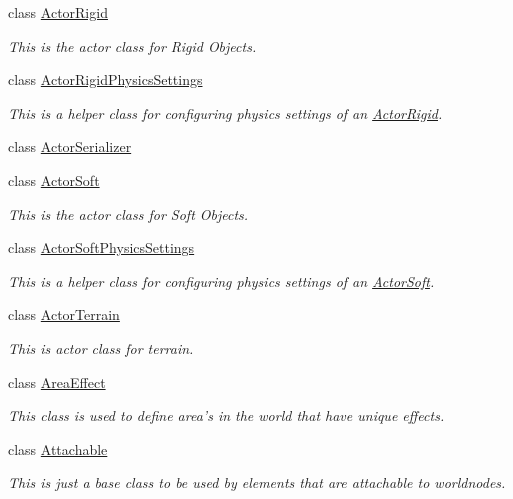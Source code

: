 \begin{DoxyCompactItemize}
class \hyperlink{classphys_1_1ActorRigid}{ActorRigid}
\begin{DoxyCompactList}\small\item\em This is the actor class for Rigid Objects. \item\end{DoxyCompactList}\item 
class \hyperlink{classphys_1_1ActorRigidPhysicsSettings}{ActorRigidPhysicsSettings}
\begin{DoxyCompactList}\small\item\em This is a helper class for configuring physics settings of an \hyperlink{classphys_1_1ActorRigid}{ActorRigid}. \item\end{DoxyCompactList}\item 
class \hyperlink{classphys_1_1ActorSerializer}{ActorSerializer}
\item 
class \hyperlink{classphys_1_1ActorSoft}{ActorSoft}
\begin{DoxyCompactList}\small\item\em This is the actor class for Soft Objects. \item\end{DoxyCompactList}\item 
class \hyperlink{classphys_1_1ActorSoftPhysicsSettings}{ActorSoftPhysicsSettings}
\begin{DoxyCompactList}\small\item\em This is a helper class for configuring physics settings of an \hyperlink{classphys_1_1ActorSoft}{ActorSoft}. \item\end{DoxyCompactList}\item 
class \hyperlink{classphys_1_1ActorTerrain}{ActorTerrain}
\begin{DoxyCompactList}\small\item\em This is actor class for terrain. \item\end{DoxyCompactList}\item 
class \hyperlink{classphys_1_1AreaEffect}{AreaEffect}
\begin{DoxyCompactList}\small\item\em This class is used to define area's in the world that have unique effects. \item\end{DoxyCompactList}\item 
class \hyperlink{classphys_1_1Attachable}{Attachable}
\begin{DoxyCompactList}\small\item\em This is just a base class to be used by elements that are attachable to worldnodes. \item\end{DoxyCompactList}\item 

\end{DoxyCompactItemize}
